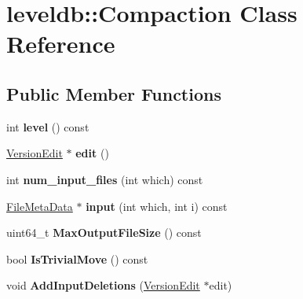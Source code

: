 \hypertarget{classleveldb_1_1_compaction}{}\section{leveldb\+::Compaction Class Reference}
\label{classleveldb_1_1_compaction}
\subsection*{Public Member Functions}
\begin{DoxyCompactItemize}
\item 
\mbox{\label{classleveldb_1_1_compaction_a716f0b644cf403944db14e7622519bd3}} 
int {\bfseries level} () const
\item 
\mbox{\label{classleveldb_1_1_compaction_a122e4f7b4fdb6c0d1862624742b34b3d}} 
\mbox{\hyperlink{classleveldb_1_1_version_edit}{Version\+Edit}} $\ast$ {\bfseries edit} ()
\item 
\mbox{\label{classleveldb_1_1_compaction_a701f2fa2d3fb00af0847aa570506e743}} 
int {\bfseries num\+\_\+input\+\_\+files} (int which) const
\item 
\mbox{\label{classleveldb_1_1_compaction_aa0999bbaeb6993759b3e76e3516589d3}} 
\mbox{\hyperlink{structleveldb_1_1_file_meta_data}{File\+Meta\+Data}} $\ast$ {\bfseries input} (int which, int i) const
\item 
\mbox{\label{classleveldb_1_1_compaction_ad4487eda793d622dbcf0483663fef2ed}} 
uint64\+\_\+t {\bfseries Max\+Output\+File\+Size} () const
\item 
\mbox{\label{classleveldb_1_1_compaction_a85ab53d400d49d1dfb7e8f63017fef99}} 
bool {\bfseries Is\+Trivial\+Move} () const
\item 
\mbox{\label{classleveldb_1_1_compaction_abb1acdc9b882a7497603b13386e7e1a7}} 
void {\bfseries Add\+Input\+Deletions} (\mbox{\hyperlink{classleveldb_1_1_version_edit}{Version\+Edit}} $\ast$edit)
\item 
\mbox{\label{classleveldb_1_1_compaction_ae982beb6ee52d92de76a363ef0eefc29}} 

\end{DoxyCompactItemize}
